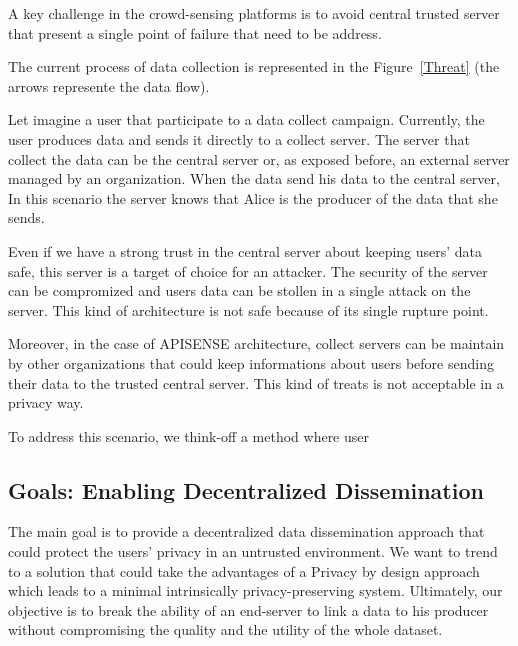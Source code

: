 A key challenge in the crowd-sensing platforms is to avoid central trusted server that present a single point of failure that need to be address.

The current process of data collection is represented in the Figure~\ref{Threat} (the arrows represente the data flow).

Let imagine a user that participate to a data collect campaign.
Currently, the user produces data and sends it directly to a collect server.
The server that collect the data can be the central server or, as exposed before, an external server managed by an organization.
When the data send his data to the central server,
In this scenario the server knows that Alice is the producer of the data that she sends.

Even if we have a strong trust in the central server about keeping users' data safe, this server is a target of choice for an attacker.
The security of the server can be compromized and users data can be stollen in a single attack on the server.
This kind of architecture is not safe because of its single rupture point.

Moreover, in the case of APISENSE architecture, collect servers can be maintain by other organizations that could keep informations about users before sending their data to the trusted central server.
This kind of treats is not acceptable in a privacy way.

To address this scenario, we think-off a method where user 




\subsection{Goals: Enabling Decentralized Dissemination}

The main goal is to provide a decentralized data dissemination approach that could protect the users' privacy in an untrusted environment.
We want to trend to a solution that could take the advantages of a Privacy by design approach which leads to a minimal intrinsically privacy-preserving system.
Ultimately, our objective is to break the ability of an end-server to link a data to his producer without compromising the quality and the utility of the whole dataset.

